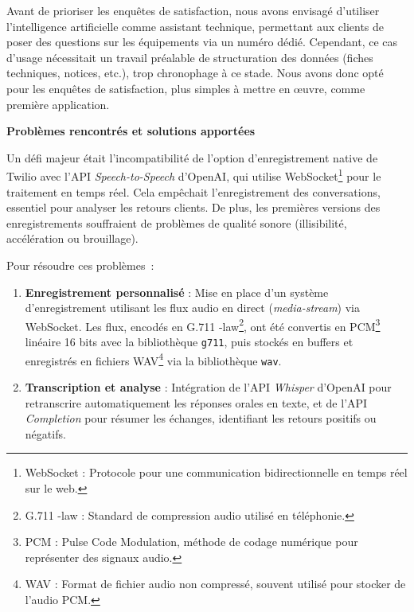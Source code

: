Avant de prioriser les enquêtes de satisfaction, nous avons envisagé d’utiliser l’intelligence artificielle comme assistant technique, permettant aux clients de poser des questions sur les équipements via un numéro dédié. Cependant, ce cas d’usage nécessitait un travail préalable de structuration des données (fiches techniques, notices, etc.), trop chronophage à ce stade. Nous avons donc opté pour les enquêtes de satisfaction, plus simples à mettre en œuvre, comme première application.\vspace{0.3cm}

\textbf{Problèmes rencontrés et solutions apportées}\vspace{0.3cm}

Un défi majeur était l’incompatibilité de l’option d’enregistrement native de Twilio avec l’API \textit{Speech-to-Speech} d’OpenAI, qui utilise WebSocket\footnote{WebSocket : Protocole pour une communication bidirectionnelle en temps réel sur le web.}
 pour le traitement en temps réel. Cela empêchait l’enregistrement des conversations, essentiel pour analyser les retours clients. De plus, les premières versions des enregistrements souffraient de problèmes de qualité sonore (illisibilité, accélération ou brouillage).\vspace{0.3cm}

Pour résoudre ces problèmes~:

\begin{enumerate}
    \item \textbf{Enregistrement personnalisé} : Mise en place d’un système d’enregistrement utilisant les flux audio en direct (\textit{media-stream}) via WebSocket. Les flux, encodés en G.711 \textmu-law\footnote{G.711 \textmu-law : Standard de compression audio utilisé en téléphonie.}, ont été convertis en PCM\footnote{PCM : Pulse Code Modulation, méthode de codage numérique pour représenter des signaux audio.}
 linéaire 16 bits avec la bibliothèque \texttt{g711}, puis stockés en buffers et enregistrés en fichiers WAV\footnote{WAV : Format de fichier audio non compressé, souvent utilisé pour stocker de l’audio PCM.}
 via la bibliothèque \texttt{wav}.\vspace{0.3cm}
    \item \textbf{Transcription et analyse} : Intégration de l’API \textit{Whisper} d’OpenAI pour retranscrire automatiquement les réponses orales en texte, et de l’API \textit{Completion} pour résumer les échanges, identifiant les retours positifs ou négatifs.\vspace{0.3cm}
\end{enumerate}

